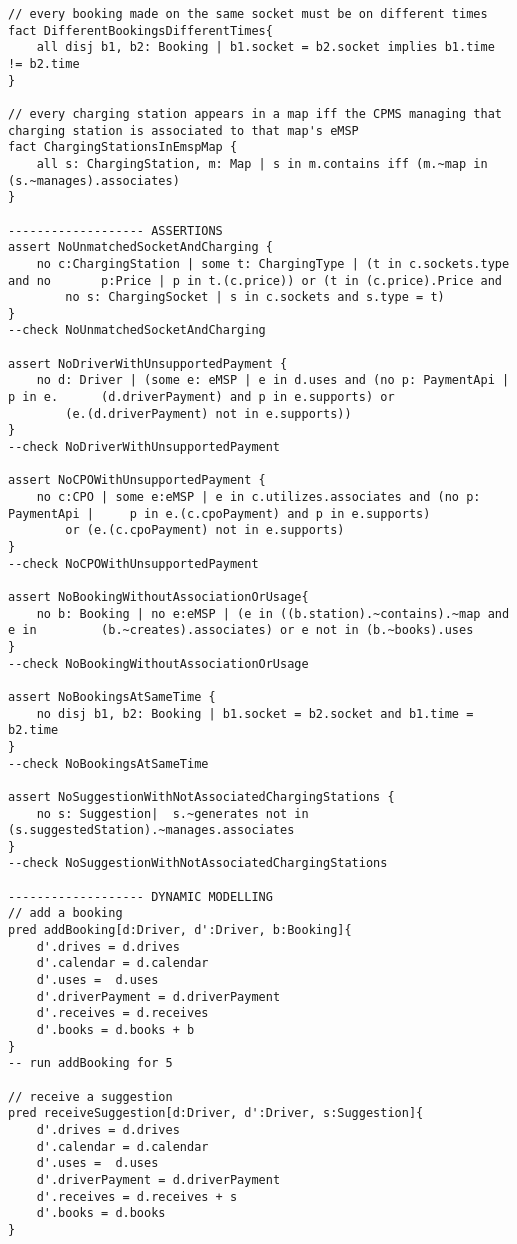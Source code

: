 \begin{lstlisting}[language=alloy]
// every booking made on the same socket must be on different times
fact DifferentBookingsDifferentTimes{
	all disj b1, b2: Booking | b1.socket = b2.socket implies b1.time != b2.time
}

// every charging station appears in a map iff the CPMS managing that charging station is associated to that map's eMSP
fact ChargingStationsInEmspMap {
    all s: ChargingStation, m: Map | s in m.contains iff (m.~map in                 (s.~manages).associates)
}

------------------- ASSERTIONS
assert NoUnmatchedSocketAndCharging {
    no c:ChargingStation | some t: ChargingType | (t in c.sockets.type and no       p:Price | p in t.(c.price)) or (t in (c.price).Price and 
        no s: ChargingSocket | s in c.sockets and s.type = t)
}
--check NoUnmatchedSocketAndCharging

assert NoDriverWithUnsupportedPayment {
    no d: Driver | (some e: eMSP | e in d.uses and (no p: PaymentApi | p in e.      (d.driverPayment) and p in e.supports) or 
        (e.(d.driverPayment) not in e.supports))
}
--check NoDriverWithUnsupportedPayment

assert NoCPOWithUnsupportedPayment {
    no c:CPO | some e:eMSP | e in c.utilizes.associates and (no p: PaymentApi |     p in e.(c.cpoPayment) and p in e.supports)
        or (e.(c.cpoPayment) not in e.supports)
}
--check NoCPOWithUnsupportedPayment

assert NoBookingWithoutAssociationOrUsage{
    no b: Booking | no e:eMSP | (e in ((b.station).~contains).~map and e in         (b.~creates).associates) or e not in (b.~books).uses
}
--check NoBookingWithoutAssociationOrUsage

assert NoBookingsAtSameTime {
	no disj b1, b2: Booking | b1.socket = b2.socket and b1.time = b2.time
}
--check NoBookingsAtSameTime

assert NoSuggestionWithNotAssociatedChargingStations {
    no s: Suggestion|  s.~generates not in (s.suggestedStation).~manages.associates
}
--check NoSuggestionWithNotAssociatedChargingStations

------------------- DYNAMIC MODELLING
// add a booking
pred addBooking[d:Driver, d':Driver, b:Booking]{
    d'.drives = d.drives
    d'.calendar = d.calendar
    d'.uses =  d.uses
    d'.driverPayment = d.driverPayment
    d'.receives = d.receives
    d'.books = d.books + b
}
-- run addBooking for 5

// receive a suggestion
pred receiveSuggestion[d:Driver, d':Driver, s:Suggestion]{
    d'.drives = d.drives
    d'.calendar = d.calendar
    d'.uses =  d.uses
    d'.driverPayment = d.driverPayment
    d'.receives = d.receives + s
    d'.books = d.books
} 


\end{lstlisting}
